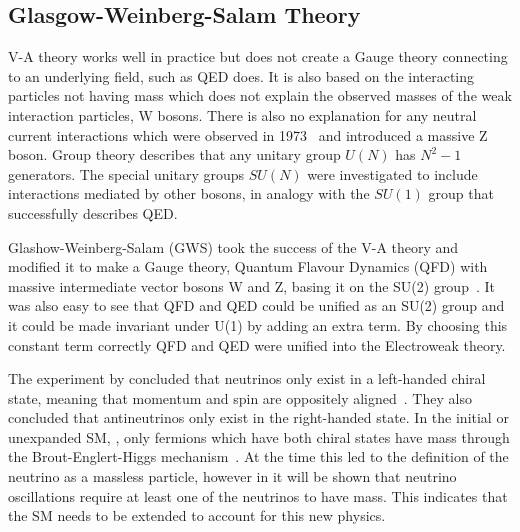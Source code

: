 \subsection{Glasgow-Weinberg-Salam Theory}\label{subsection:SMN}
V-A theory works well in practice but does not create a Gauge theory connecting to an underlying field, such as QED does. It is also based on the interacting particles not having mass which does not explain the observed masses of the weak interaction particles, W bosons. There is also no explanation for any neutral current interactions which were observed in 1973~\cite{91Hasert} and introduced a massive Z boson. Group theory describes that any unitary group $U(N)$ has $N^2 -1$ generators. The special unitary groups $SU(N)$ were investigated to include interactions mediated by other bosons, in analogy with the $SU(1)$ group that successfully describes QED.


Glashow-Weinberg-Salam (GWS) took the success of the V-A theory and modified it to make a Gauge theory, Quantum Flavour Dynamics (QFD) with massive intermediate vector bosons W and Z, basing it on the SU(2) group~\cite{92Weinberg, 93Salam, 94Glashow}. It was also easy to see that QFD and QED could be unified as an SU(2) group and it could be made invariant under U(1) by adding an extra term. By choosing this constant term correctly QFD and QED were unified into the Electroweak theory.

The experiment by \citeauthor{1Helicity} concluded that neutrinos only exist in a left-handed chiral state, meaning that momentum and spin are oppositely aligned~\cite{1Helicity}. They also concluded that antineutrinos only exist in the right-handed state. In the initial or unexpanded SM, \cite{34doi:10.1142/9789812562203_0002}, only fermions which have both chiral states have mass through the Brout\hyp{}Englert\hyp{}Higgs mechanism~\cite{35Higgs}. At the time this led to the definition of the neutrino as a massless particle, however in  it will be shown that neutrino oscillations require at least one of the neutrinos to have mass. This indicates that the SM needs to be extended to account for this new physics.


